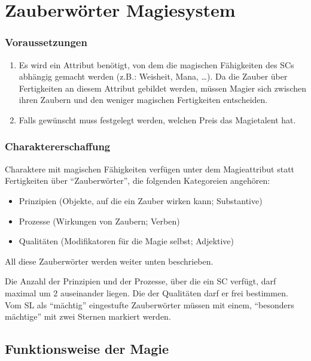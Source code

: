 \section{Zauberwörter Magiesystem}
\label{sect:ZauberwoerterMagiesystem}
\subsubsection{Voraussetzungen}
\begin{enumerate}
\item Es wird ein Attribut benötigt, von dem die magischen Fähigkeiten des SCs abhängig gemacht werden (z.B.: Weisheit, Mana, \dots). Da die Zauber über Fertigkeiten an diesem Attribut gebildet werden, müssen Magier sich zwischen ihren Zaubern und den weniger magischen Fertigkeiten entscheiden.
\item Falls gewünscht muss festgelegt werden, welchen Preis das Magietalent hat.
\end{enumerate}
\subsubsection{Charaktererschaffung}

Charaktere mit magischen Fähigkeiten verfügen unter dem Magieattribut statt Fertigkeiten über "`Zauberwörter"', die folgenden Kategoreien angehören:
\begin{itemize}
\item Prinzipien (Objekte, auf die ein Zauber wirken kann; Substantive)
\item Prozesse (Wirkungen von Zaubern; Verben)
\item Qualitäten (Modifikatoren für die Magie selbst; Adjektive)
\end{itemize}
All diese Zauberwörter werden weiter unten beschrieben.

Die Anzahl der Prinzipien und der Prozesse, über die ein SC verfügt, darf maximal um 2 auseinander liegen. Die der Qualitäten darf er frei bestimmen. Vom SL als "`mächtig"' eingestufte Zauberwörter müssen mit einem, "`besonders mächtige"' mit zwei Sternen markiert werden.

\subsection{Funktionsweise der Magie}

